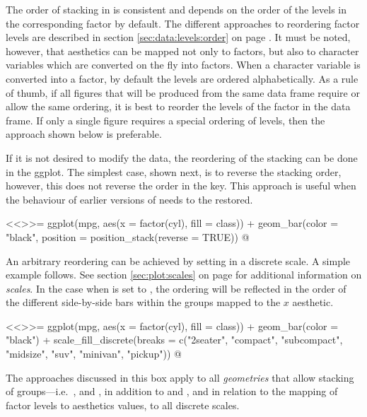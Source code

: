 \begin{explainbox}
The order of stacking in \ggplot is consistent and depends on the order of the levels in the corresponding factor by default. The different approaches to reordering factor levels are described in section \ref{sec:data:levels:order} on page \pageref{sec:data:levels:order}. It must be noted, however, that aesthetics can be mapped not only to factors, but also to character variables which are converted on the fly into factors. When a character variable is converted into a factor, by default the levels are ordered alphabetically. As a rule of thumb, if all figures that will be produced from the same data frame require or allow the same ordering, it is best to reorder the levels of the factor in the data frame. If only a single figure requires a special ordering of levels, then the approach shown below is preferable.

If it is not desired to modify the data, the reordering of the stacking can be done in the ggplot. The simplest case, shown next, is to reverse the stacking order, however, this does not reverse the order in the key. This approach is useful when the behaviour of earlier versions of \ggplot needs to the restored.

<<>>=
ggplot(mpg, aes(x = factor(cyl), fill = class)) +
  geom_bar(color = "black", position = position_stack(reverse = TRUE))
@

An arbitrary reordering can be achieved by setting  in a discrete scale. A simple example follows. See section \ref{sec:plot:scales} on page \pageref{sec:plot:scales} for additional information on \emph{scales}. In the case when  is set to , the ordering will be reflected in the order of the different side-by-side bars within the groups mapped to the $x$ aesthetic.

<<>>=
ggplot(mpg, aes(x = factor(cyl), fill = class)) +
  geom_bar(color = "black") +
  scale_fill_discrete(breaks = c("2seater", "compact",  "subcompact",
                                 "midsize",  "suv",  "minivan", "pickup"))
@

The approaches discussed in this box apply to all \emph{geometries} that allow stacking of groups---i.e.\ , and , in addition to  and , and in relation to the mapping of factor levels to aesthetics values, to all discrete scales.
\end{explainbox}

